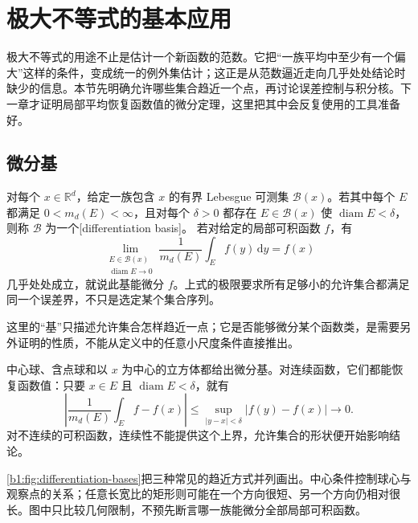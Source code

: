 \section{极大不等式的基本应用}
\label{b1:sec:1304}

极大不等式的用途不止是估计一个新函数的范数。它把“一族平均中至少有一个偏大”这样的条件，变成统一的例外集估计；这正是从范数逼近走向几乎处处结论时缺少的信息。本节先明确允许哪些集合趋近一个点，再讨论误差控制与积分核。下一章才证明局部平均恢复函数值的微分定理，这里把其中会反复使用的工具准备好。

\subsection{微分基}
\label{b1:subsec:130401}

\begin{definition}\label{b1:def:differentiation-basis}
对每个 \(x\in\mathbb R^d\)，给定一族包含 \(x\) 的有界 Lebesgue 可测集 \(\mathcal B(x)\)。若其中每个 \(E\) 都满足 \(0<m_d(E)<\infty\)，且对每个 \(\delta>0\) 都存在 \(E\in\mathcal B(x)\) 使 \(\operatorname{diam}E<\delta\)，则称 \(\mathcal B\) 为一个[differentiation basis]。
若对给定的局部可积函数 \(f\)，有
\[
 \lim_{\substack{E\in\mathcal B(x)\\\operatorname{diam}E\to0}}
       \frac1{m_d(E)}\int_E f(y)\,\mathrm dy=f(x)
\]
几乎处处成立，就说此基能微分 \(f\)。上式的极限要求所有足够小的允许集合都满足同一个误差界，不只是选定某个集合序列。
\end{definition}

这里的“基”只描述允许集合怎样趋近一点；它是否能够微分某个函数类，是需要另外证明的性质，不能从定义中的任意小尺度条件直接推出。

\ProseParagraphBreak

中心球、含点球和以 \(x\) 为中心的立方体都给出微分基。对连续函数，它们都能恢复函数值：只要 \(x\in E\) 且 \(\operatorname{diam}E<\delta\)，就有
\[
 \left|\frac1{m_d(E)}\int_E f-f(x)\right|
 \leq\sup_{|y-x|<\delta}|f(y)-f(x)|\longrightarrow0.
\]
对不连续的可积函数，连续性不能提供这个上界，允许集合的形状便开始影响结论。

\ProseParagraphBreak

\cref{b1:fig:differentiation-bases}把三种常见的趋近方式并列画出。中心条件控制球心与观察点的关系；任意长宽比的矩形则可能在一个方向很短、另一个方向仍相对很长。图中只比较几何限制，不预先断言哪一族能微分全部局部可积函数。

